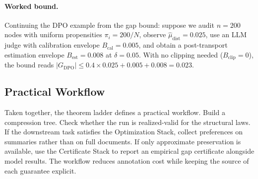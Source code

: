 \paragraph{Worked bound.}
Continuing the DPO example from the gap bound: suppose we audit $n = 200$ nodes with uniform propensities $\pi_i = 200/N$, observe $\hat{\mu}_{\mathrm{dist}} = 0.025$, use an LLM judge with calibration envelope $B_{\mathrm{cal}} = 0.005$, and obtain a post-transport estimation envelope $B_{\mathrm{est}} = 0.008$ at $\delta = 0.05$. With no clipping needed ($B_{\mathrm{clip}} = 0$), the bound reads $|G_{\mathrm{DPO}}| \le 0.4 \times 0.025 + 0.005 + 0.008 = 0.023$.

\subsection{Practical Workflow}

Taken together, the theorem ladder defines a practical workflow. Build a compression tree. Check whether the run is realized-valid for the structural laws. If the downstream task satisfies the Optimization Stack, collect preferences on summaries rather than on full documents. If only approximate preservation is available, use the Certificate Stack to report an empirical gap certificate alongside model results. The workflow reduces annotation cost while keeping the source of each guarantee explicit.
